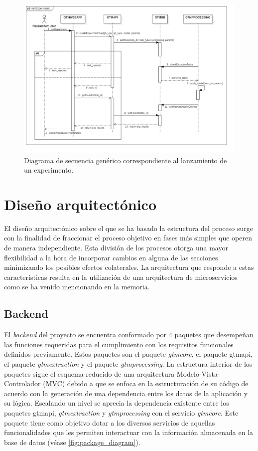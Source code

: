\begin{figure}
	\centering
\includegraphics[width=\textwidth]{img/sec_diagram_run_experiment.png}
	\caption{Diagrama de secuencia genérico correspondiente al lanzamiento de un experimento.}
	\label{fig:sec_diagram_run_experiment}
\end{figure}

\clearpage
\section{Diseño arquitectónico} \label{sec:archdesign}

El diseño arquitectónico sobre el que se ha basado la estructura del proceso surge con la finalidad de fraccionar el proceso objetivo en fases más simples que operen de manera independiente. Esta división de los procesos otorga una mayor flexibilidad a la hora de incorporar cambios en alguna de las secciones minimizando los posibles efectos colaterales. La arquitectura que responde a estas características resulta en la utilización de una arquitectura de microservicios como se ha venido mencionando en la memoria.

\subsection{Backend}

El \textit{backend} del proyecto se encuentra conformado por 4 paquetes que desempeñan las funciones requeridas para el cumplimiento con los requisitos funcionales definidos previamente. Estos paquetes son el paquete \textit{gtmcore}, el paquete gtmapi, el paquete \textit{gtmextraction} y el paquete \textit{gtmprocessing}. La estructura interior de los paquetes sigue el esquema reducido de una arquitectura Modelo-Vista-Controlador (MVC) debido a que se enfoca en la estructuración de su código de acuerdo con la generación de una dependencia entre los datos de la aplicación y su lógica. Escalando un nivel se aprecia la dependencia existente entre los paquetes gtmapi, \textit{gtmextraction} y \textit{gtmprocessing} con el servicio \textit{gtmcore}. Este paquete tiene como objetivo dotar a los diversos servicios de aquellas funcionalidades que les permiten interactuar con la información almacenada en la base de datos (véase \autoref{fig:package_diagram}).

